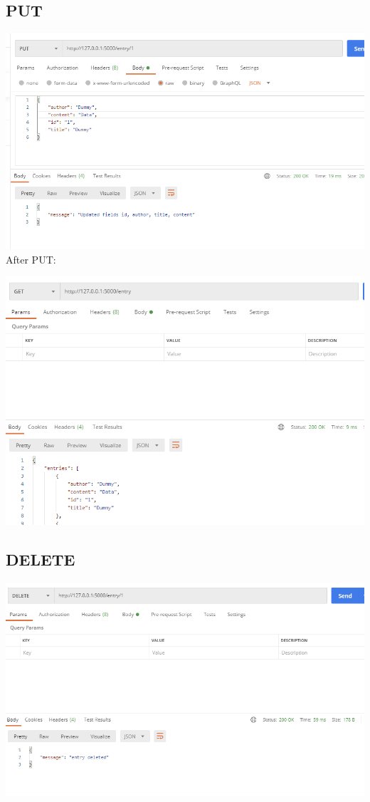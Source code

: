 \documentclass{article}
\begin{document}
    \subsection*{PUT}

    \includegraphics[width=\textwidth]{img/put.png}\\

    After PUT:

    \includegraphics[width=\textwidth]{img/afterput.png}\\

    \subsection*{DELETE}

    \includegraphics[width=\textwidth]{img/delete.png}\\
\end{document}
